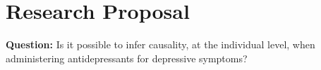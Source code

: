 \documentclass[12pt,letterpaper,doublespace, oneside]{article}
\begin{document}
\newcommand{\zz}{\mathbx Z}   %
\newcommand{\qq}{\mathbx Q}   %
\newcommand{\ff}{\mathbx F}   %
\newcommand{\rr}{\mathbx R}   %
\newcommand{\nn}{\mathbx N}   %
\newcommand{\cc}{\mathbx C}   %
\newcommand{\dd}{\mathsf D}   
\newcommand{\id}{\operatorname{id}} %
\newcommand{\im}{\operatorname{im}} %
\newcommand{\dom}{\operatorname{dom}} %
\newcommand{\abs}[1]{\left\lvert#1\right\rvert} %
\newcommand{\norm}[1]{\left\lVert#1\right\rVert} %
\newcommand{\modar}[1]{\operatorname{mod}{#1}} %
\newcommand{\set}[1]{\left\{#1\right\}} %
\newcommand{\setp}[2]{\left\{#1\ :\ #2\right\}} %
\newcommand{\lag}{\mathcal{L}}

\renewcommand\thepage{}

\renewcommand{\epsilon}{\varepsilon}
\renewcommand{\phi}{\varphi}
\renewcommand{\emptyset}{\varnothing}
\renewcommand{\geq}{\geqslant}
\renewcommand{\leq}{\leqslant}
\renewcommand{\Re}{\operatorname{Re}}
\renewcommand{\Im}{\operatorname{Im}}


\theoremstyle{theorem}
\newtheorem{theorem}{Theorem}
\theoremstyle{proposition}
\newtheorem{proposition}{Proposition}
\theoremstyle{definition}
\newtheorem{definition}{Definition}
\theoremstyle{lemma}
\newtheorem{lemma}[theorem]{Lemma}
\theoremstyle{corollary}
\newtheorem{corollary}[theorem]{Corollary}
\theoremstyle{example}
\newtheorem{example}[theorem]{Example}
\theoremstyle{remark}
\newtheorem{remark}[theorem]{Remark}
\theoremstyle{conclusion}
\newtheorem{conclusion}[theorem]{Conclusion}






\section{Research Proposal}
\noindent\textbf{Question:} Is it possible to infer causality, at the individual level, when administering antidepressants for depressive symptoms? 
\end{document}
